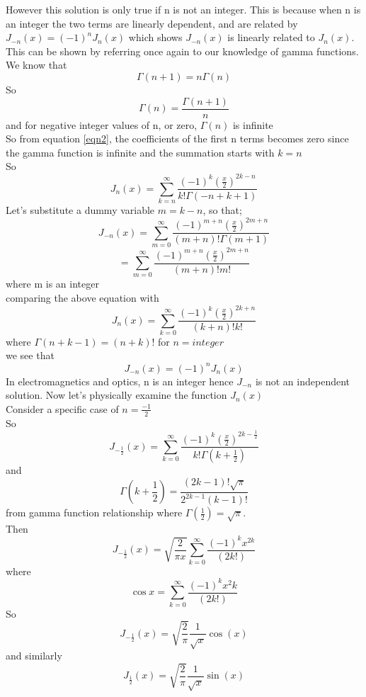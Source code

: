 	However this solution is only true if n is not an integer. This is because when n is an integer the two terms are linearly dependent, and are related by $ J_{-n}(x) = (-1)^n J_n(x)$ which shows $J_{-n}(x)$ is linearly related to $ J_n(x).$ This can be shown by referring once again to our knowledge of gamma functions.
	\\
	We know that $$\Gamma(n + 1) = n \Gamma(n)$$
	So 	$$\Gamma(n) = \frac{\Gamma(n + 1)}{n} $$
	and for negative integer values of n, or zero, $\Gamma(n)$ is infinite \\
	So from equation \ref{eqn2}, the coefficients of the first n terms becomes zero since the gamma function is infinite and the summation starts with $k=n$
	\\
	So 	$$J_n(x) = \sum_{k = n}^{\infty}\frac{(-1)^k (\frac{x}{2})^{2k - n}}{k! \Gamma(-n + k + 1)}$$
	Let's substitute a dummy variable $m= k - n$, so that;
	$$J_{-n}(x) = \sum_{m = 0}^{\infty}\frac{(-1)^{m + n} (\frac{x}{2})^{2m + n}}{(m + n)! \Gamma(m + 1)}$$
	$$= \sum_{m = 0}^{\infty}\frac{(-1)^{m + n} (\frac{x}{2})^{2m + n}}{(m + n)! m!}$$ where m is an integer\\
	comparing the above equation with
	$$J_n(x) = \sum_{k = 0}^{\infty}\frac{(-1)^k (\frac{x}{2})^{2k + n}}{(k + n)! k!}$$ where $\Gamma(n + k - 1)=(n + k)!$ for $n= integer$\\
	we see that $$J_{-n}(x) = (-1)^n J_n(x)$$
	In electromagnetics and optics, n is an integer hence $J_{-n}$ is not an independent solution. Now let's physically examine the function $J_n(x)$ \\
	Consider a specific case of $n = \frac{-1}{2}$
	\\
	So $$J_{-\frac{1}{2}}(x) = \sum_{k = 0}^{\infty}\frac{(-1)^k (\frac{x}{2})^{2k - \frac{1}{2}}}{k! \Gamma( k + \frac{1}{2})}$$
	and $$\Gamma( k + \frac{1}{2}) = \frac{(2k - 1)! \sqrt{\pi}}{2^{2k - 1}(k - 1)!}$$
	from gamma function relationship where $\Gamma(\frac{1}{2}) = \sqrt{\pi}$.\\
	Then
	$$J_{-\frac{1}{2}}(x) = \sqrt{\frac{2}{\pi x}}\sum_{k = 0}^{\infty}\frac{(-1)^k x^{2k}}{(2k!)}$$
	where $$\cos x =\sum_{k = 0}^{\infty}\frac{(-1)^k x^2k}{(2k!)}$$
	So $$J_{-\frac{1}{2}}(x) = \sqrt{\frac{2}{\pi}}\frac{1}{\sqrt{x}}\cos(x)$$
	and similarly $$J_{\frac{1}{2}}(x) = \sqrt{\frac{2}{\pi}}\frac{1}{\sqrt{x}}\sin(x)$$


